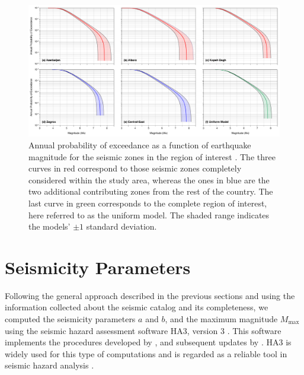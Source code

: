 \begin{figure}[t]
    \centering
    \includegraphics[width=\textwidth]{figures/pdf/figure-07}
    \caption{Annual probability of exceedance as a function of earthquake magnitude for the seismic zones in the region of interest . The three curves in red correspond to those seismic zones completely considered within the study area, whereas the ones in blue are the two additional contributing zones from the rest of the country. The last curve in green corresponds to the complete region of interest, here referred to as the uniform model. The shaded range indicates the models' $\pm 1$ standard deviation.}
    \label{fig:annualp}
\end{figure}

\section{Seismicity Parameters}
\label{sec:params}

Following the general approach described in the previous sections and using the information collected about the seismic catalog and its completeness, we computed the seismicity parameters $a$ and $b$, and the maximum magnitude $M_{\max}$ using the seismic hazard assessment software HA3, version 3 \citep{Kijko_2004_HA3}. This software implements the procedures developed by \citet{Kijko_1989_BSSA, Kijko_1992_BSSA}, and subsequent updates by \citet{Kijko_2004_PAG}. HA3 is widely used for this type of computations and is regarded as a reliable tool in seismic hazard analysis \citep[see, for instance,][]{Karimiparidari2013, Khodaverdian_2016_BSSA}.

